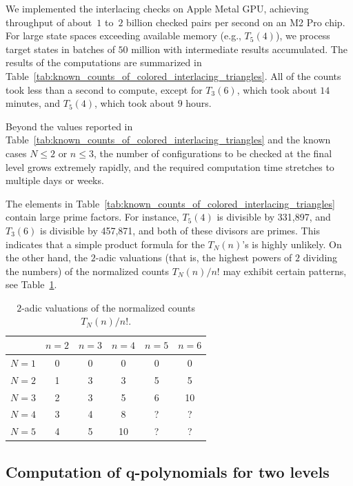 \documentclass[10pt,a4paper]{amsart}
\numberwithin{equation}{section}
\theoremstyle{definition}
\begin{document}
We implemented the interlacing checks on Apple Metal GPU, achieving throughput
of about~$1$ to~$2$ billion checked pairs per second on an M2 Pro chip.
For large state spaces exceeding available memory (e.g., $T_5(4)$), we process
target states in batches of $50$ million with intermediate results accumulated.
The results of the computations are summarized in
Table~\ref{tab:known_counts_of_colored_interlacing_triangles}.
All of the counts took less than a second to compute, except for $T_3(6)$, which
took about $14$ minutes, and $T_5(4)$, which took about $9$ hours.

Beyond the values reported in
Table~\ref{tab:known_counts_of_colored_interlacing_triangles} and the known cases
$N\le 2$ or $n\le 3$, the number of configurations to be checked at the final
level grows extremely rapidly, and the required computation time stretches to
multiple days or weeks.

The elements in Table~\ref{tab:known_counts_of_colored_interlacing_triangles} contain
large prime factors.
For instance, $T_5(4)$ is divisible by 331,897, and $T_3(6)$ is divisible by
457,871, and both of these divisors are primes.
This indicates that a simple product formula for the $T_N(n)$'s is highly
unlikely.
On the other hand, the $2$-adic valuations (that is, the highest powers of $2$
dividing the numbers) of the normalized counts $T_N(n)/n!$ may exhibit certain
patterns, see Table~\ref{tab:2_adic_valuations}.

\begin{table}[htpb]
	\centering
	\begin{tabular}{|c|c|c|c|c|c|}
		\hline               & $n=2$ & $n=3$ & $n=4$ & $n=5$ & $n=6$ \\
		\hline
		$N=1$ & 0     & 0     & 0     & 0     & 0 \\
		\hline
		$N=2$ & 1     & 3     & 3     & 5     & 5 \\
		\hline
		$N=3$ & 2     & 3     & 5     & 6     & 10 \\
		\hline
		$N=4$ & 3     & 4     & 8     & ?     & ? \\
		\hline
		$N=5$ & 4     & 5     & 10    & ?     & ? \\
		\hline
	\end{tabular}
	\caption{$2$-adic valuations of the normalized counts $T_N(n)/n!$.}\label{tab:2_adic_valuations}
\end{table}

\subsection[Computation of q-polynomials for two levels]{Computation of $\boldsymbol{q}$-polynomials for two levels}
\label{subsec:q_data}
\end{document}
